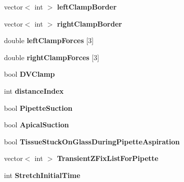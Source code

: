 \begin{DoxyCompactItemize}
\item 
\hypertarget{classSimulation_aac766f573e9afb8b9cc9296dbb3be436}{}vector$<$ int $>$ {\bfseries left\+Clamp\+Border}\label{classSimulation_aac766f573e9afb8b9cc9296dbb3be436}

\item 
\hypertarget{classSimulation_a911f50674e81c594c08ee991c23b986a}{}vector$<$ int $>$ {\bfseries right\+Clamp\+Border}\label{classSimulation_a911f50674e81c594c08ee991c23b986a}

\item 
\hypertarget{classSimulation_ad6d5bb340613f0a93a71bb8f3a73f609}{}double {\bfseries left\+Clamp\+Forces} \mbox{[}3\mbox{]}\label{classSimulation_ad6d5bb340613f0a93a71bb8f3a73f609}

\item 
\hypertarget{classSimulation_aa88acfad799773f87059228a07d40b37}{}double {\bfseries right\+Clamp\+Forces} \mbox{[}3\mbox{]}\label{classSimulation_aa88acfad799773f87059228a07d40b37}

\item 
\hypertarget{classSimulation_af99671c6b222e164dd65bd969632480f}{}bool {\bfseries D\+V\+Clamp}\label{classSimulation_af99671c6b222e164dd65bd969632480f}

\item 
\hypertarget{classSimulation_ac21ce1a13eb2eedd549a1f61232b948b}{}int {\bfseries distance\+Index}\label{classSimulation_ac21ce1a13eb2eedd549a1f61232b948b}

\item 
\hypertarget{classSimulation_a10cfa63b384b954f5ea34afca788f298}{}bool {\bfseries Pipette\+Suction}\label{classSimulation_a10cfa63b384b954f5ea34afca788f298}

\item 
\hypertarget{classSimulation_a53d18b41ab9318966acb05815ab4deb0}{}bool {\bfseries Apical\+Suction}\label{classSimulation_a53d18b41ab9318966acb05815ab4deb0}

\item 
\hypertarget{classSimulation_aac639bb76a25b8df8917d6e288358110}{}bool {\bfseries Tissue\+Stuck\+On\+Glass\+During\+Pipette\+Aspiration}\label{classSimulation_aac639bb76a25b8df8917d6e288358110}

\item 
\hypertarget{classSimulation_a614017cf64e201c1897117b6ce31e17c}{}vector$<$ int $>$ {\bfseries Transient\+Z\+Fix\+List\+For\+Pipette}\label{classSimulation_a614017cf64e201c1897117b6ce31e17c}

\item 
\hypertarget{classSimulation_a8b7c90b578a80c574d7f8c35adac0afd}{}int {\bfseries Stretch\+Initial\+Time}\label{classSimulation_a8b7c90b578a80c574d7f8c35adac0afd}


\end{DoxyCompactItemize}
